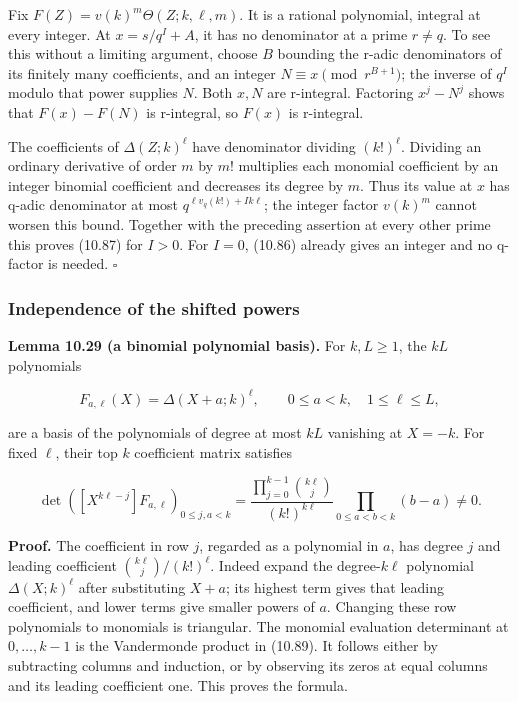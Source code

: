\documentclass[
  11pt,
  a4paper,
]{article}
\begin{document}
Fix \(F(Z)=v(k)^m\Theta(Z;k,\ell,m)\). It is a rational polynomial,
integral at every integer. At \(x=s/q^I+A\), it has no denominator at a
prime \(r\ne q\). To see this without a limiting argument, choose \(B\)
bounding the r-adic denominators of its finitely many coefficients, and
an integer \(N\equiv x\pmod{r^{B+1}}\); the inverse of \(q^I\) modulo
that power supplies \(N\). Both \(x,N\) are r-integral. Factoring
\(x^j-N^j\) shows that \(F(x)-F(N)\) is r-integral, so \(F(x)\) is
r-integral.

The coefficients of \(\Delta(Z;k)^\ell\) have denominator dividing
\((k!)^\ell\). Dividing an ordinary derivative of order \(m\) by \(m!\)
multiplies each monomial coefficient by an integer binomial coefficient
and decreases its degree by \(m\). Thus its value at \(x\) has q-adic
denominator at most \(q^{\ell v_q(k!)+Ik\ell}\); the integer factor
\(v(k)^m\) cannot worsen this bound. Together with the preceding
assertion at every other prime this proves (10.87) for \(I>0\). For
\(I=0\), (10.86) already gives an integer and no q-factor is needed.
\(\square\)

\subsubsection{Independence of the shifted
powers}\label{independence-of-the-shifted-powers}

\textbf{Lemma 10.29 (a binomial polynomial basis).} For \(k,L\ge1\), the
\(kL\) polynomials

\[
F_{a,\ell}(X)=\Delta(X+a;k)^\ell,
\qquad 0\le a<k,\quad1\le\ell\le L,
\tag{10.88}
\]

are a basis of the polynomials of degree at most \(kL\) vanishing at
\(X=-k\). For fixed \(\ell\), their top \(k\) coefficient matrix
satisfies

\[
\det\left([X^{k\ell-j}]F_{a,\ell}\right)_{0\le j,a<k}
=\frac{\prod_{j=0}^{k-1}\binom{k\ell}{j}}
{(k!)^{k\ell}}\prod_{0\le a<b<k}(b-a)\ne0.
\tag{10.89}
\]

\textbf{Proof.} The coefficient in row \(j\), regarded as a polynomial
in \(a\), has degree \(j\) and leading coefficient
\(\binom{k\ell}j/(k!)^\ell\). Indeed expand the degree-\(k\ell\)
polynomial \(\Delta(X;k)^\ell\) after substituting \(X+a\); its highest
term gives that leading coefficient, and lower terms give smaller powers
of \(a\). Changing these row polynomials to monomials is triangular. The
monomial evaluation determinant at \(0,\ldots,k-1\) is the Vandermonde
product in (10.89). It follows either by subtracting columns and
induction, or by observing its zeros at equal columns and its leading
coefficient one. This proves the formula.
\end{document}
